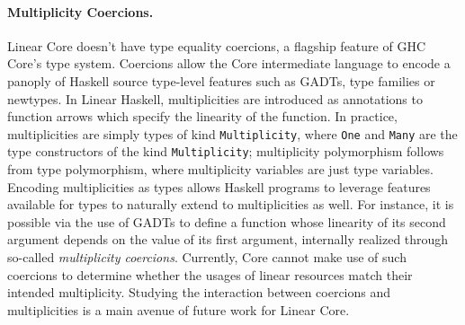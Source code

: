 \documentclass[acmsmall,review]{acmart}
\newcommand{\incode}[1]{\lstinline{#1}}
\begin{document}
\paragraph{Multiplicity Coercions.}
Linear Core doesn't have type equality coercions, a flagship feature of GHC
Core's type system.
%
Coercions %
allow the Core intermediate language to encode a panoply of Haskell source
type-level features such as GADTs, type families or newtypes.
%
In Linear Haskell, multiplicities are introduced as annotations to function
arrows which specify the linearity of the function. In practice,
multiplicities are simply types of kind \incode{Multiplicity}, where \incode{One} and \incode{Many}
are the type constructors of the kind \incode{Multiplicity}; multiplicity polymorphism
follows from type polymorphism, where multiplicity variables are
just type variables. Encoding multiplicities as types allows Haskell programs
to leverage features available for types to naturally extend to multiplicities
as well.
For instance, it is possible via the use of GADTs to define a
function whose linearity of its second argument depends on the value
of its first argument, internally realized through so-called
\emph{multiplicity coercions}. Currently, Core cannot make use of such
coercions to determine whether the usages of linear resources match
their intended multiplicity. Studying the interaction between coercions and multiplicities is a main avenue
of future work for Linear Core.
%


\end{document}
